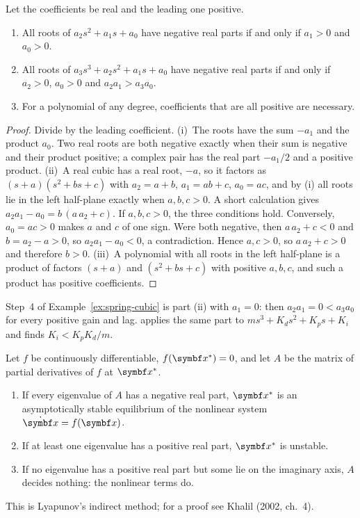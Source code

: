 \begin{theorem}
\label{thm:spring-routh}
Let the coefficients be real and the leading one positive.
\begin{enumerate}[label=(\roman*)]
  \item All roots of $a_2 s^2 + a_1 s + a_0$ have negative real parts if and only if $a_1 > 0$ and $a_0 > 0$.
  \item All roots of $a_3 s^3 + a_2 s^2 + a_1 s + a_0$ have negative real parts if and only if $a_2 > 0$, $a_0 > 0$ and $a_2 a_1 > a_3 a_0$.
  \item For a polynomial of any degree, coefficients that are all positive are necessary.
\end{enumerate}
\end{theorem}
\begin{proof}
Divide by the leading coefficient. (i)~The roots have the sum $-a_1$ and the product $a_0$. Two real roots are both negative exactly when their sum is negative and their product positive; a complex pair has the real part $-a_1/2$ and a positive product.
(ii)~A real cubic has a real root, $-a$, so it factors as $(s + a)(s^2 + bs + c)$ with $a_2 = a + b$, $a_1 = ab + c$, $a_0 = ac$, and by (i) all roots lie in the left half-plane exactly when $a, b, c > 0$. A short calculation gives $a_2 a_1 - a_0 = b\,(a\,a_2 + c)$. If $a, b, c > 0$, the three conditions hold. Conversely, $a_0 = ac > 0$ makes $a$ and $c$ of one sign. Were both negative, then $a\,a_2 + c < 0$ and $b = a_2 - a > 0$, so $a_2 a_1 - a_0 < 0$, a contradiction. Hence $a, c > 0$, so $a\,a_2 + c > 0$ and therefore $b > 0$.
(iii)~A polynomial with all roots in the left half-plane is a product of factors $(s + a)$ and $(s^2 + bs + c)$ with positive $a, b, c$, and such a product has positive coefficients.
\end{proof}

Step~4 of Example~\ref{ex:spring-cubic} is part (ii) with $a_1 = 0$: then $a_2 a_1 = 0 < a_3 a_0$ for every positive gain and lag.  applies the same part to $m s^3 + K_d s^2 + K_p s + K_i$ and finds $K_i < K_p K_d/m$.

\begin{theorem}
\label{thm:spring-indirect}
Let $f$ be continuously differentiable, $f(\vx^*) = 0$, and let $A$ be the matrix of partial derivatives of $f$ at $\vx^*$.
\begin{enumerate}[label=(\roman*)]
  \item If every eigenvalue of $A$ has a negative real part, $\vx^*$ is an asymptotically stable equilibrium of the nonlinear system $\dot{\vx} = f(\vx)$.
  \item If at least one eigenvalue has a positive real part, $\vx^*$ is unstable.
  \item If no eigenvalue has a positive real part but some lie on the imaginary axis, $A$ decides nothing: the nonlinear terms do.
\end{enumerate}
This is Lyapunov's indirect method; for a proof see Khalil (2002, ch.~4).
\end{theorem}


